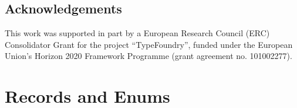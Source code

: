 \documentclass[acmsmall,screen,review]{acmart}
\begin{document}
\subsection*{Acknowledgements}

This work was supported in part by a European Research Council (ERC) Consolidator Grant for the
project ``TypeFoundry'', funded under the European Union's Horizon 2020 Framework Programme (grant
agreement no. 101002277).




\clearpage 

\appendix

\section{Records and Enums}

\label{apx:records-enums}
\end{document}
